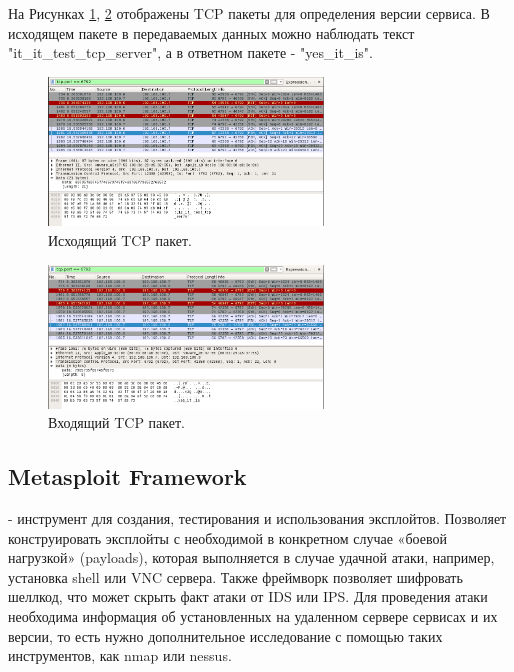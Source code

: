 \documentclass[10pt,a4paper]{report}
\begin{document}
На Рисунках \ref{Img:8}, \ref{Img:9} отображены TCP пакеты для определения версии сервиса. В исходящем пакете в передаваемых данных можно наблюдать текст "it\_it\_test\_tcp\_server", а в ответном пакете - "yes\_it\_is".

\begin{figure}[h]
	\begin{center}
		\includegraphics[width=0.65\textwidth]{Img/8}
		\caption{Исходящий TCP пакет.}
		\label{Img:8}
	\end{center}
\end{figure}

\begin{figure}[h]
	\begin{center}
		\includegraphics[width=0.65\textwidth]{Img/9}
		\caption{Входящий TCP пакет.}
		\label{Img:9}
	\end{center}
\end{figure}

\subsection{Metasploit Framework}
\label{msf}

- инструмент для создания, тестирования и использования эксплойтов. Позволяет конструировать эксплойты с необходимой в конкретном случае «боевой нагрузкой» (payloads), которая выполняется в случае удачной атаки, например, установка shell или VNC сервера. Также фреймворк позволяет шифровать шеллкод, что может скрыть факт атаки от IDS или IPS. Для проведения атаки необходима информация об установленных на удаленном сервере сервисах и их версии, то есть нужно дополнительное исследование с помощью таких инструментов, как nmap или nessus.
\end{document}

